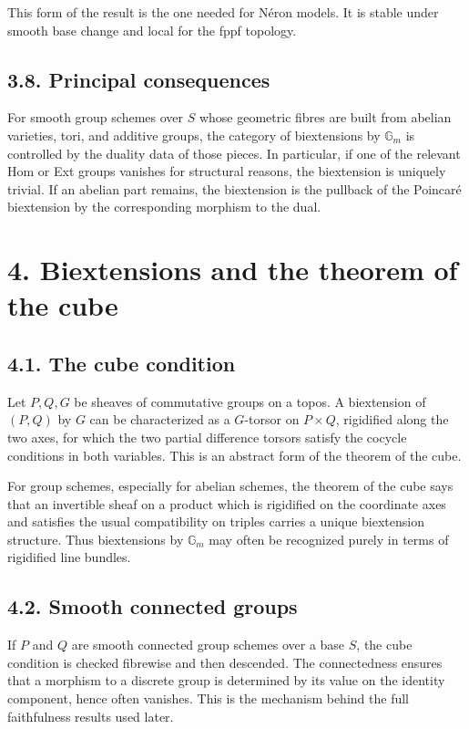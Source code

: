 \documentclass[11pt]{article}
\newcommand{\Gm}{\mathbb G_m}
\begin{document}
This form of the result is the one needed for Néron models. It is stable under
smooth base change and local for the fppf topology.

\subsection*{3.8. Principal consequences}

For smooth group schemes over \(S\) whose geometric fibres are built from
abelian varieties, tori, and additive groups, the category of biextensions by
\(\Gm\) is controlled by the duality data of those pieces. In particular, if one
of the relevant Hom or Ext groups vanishes for structural reasons, the
biextension is uniquely trivial. If an abelian part remains, the biextension is
the pullback of the Poincaré biextension by the corresponding morphism to the
dual.

\section*{4. Biextensions and the theorem of the cube}

\subsection*{4.1. The cube condition}

Let \(P,Q,G\) be sheaves of commutative groups on a topos. A biextension of
\((P,Q)\) by \(G\) can be characterized as a \(G\)-torsor on \(P\times Q\),
rigidified along the two axes, for which the two partial difference torsors
satisfy the cocycle conditions in both variables. This is an abstract form of the
theorem of the cube.

For group schemes, especially for abelian schemes, the theorem of the cube says
that an invertible sheaf on a product which is rigidified on the coordinate axes
and satisfies the usual compatibility on triples carries a unique biextension
structure. Thus biextensions by \(\Gm\) may often be recognized purely in terms
of rigidified line bundles.

\subsection*{4.2. Smooth connected groups}

If \(P\) and \(Q\) are smooth connected group schemes over a base \(S\), the cube
condition is checked fibrewise and then descended. The connectedness ensures that
a morphism to a discrete group is determined by its value on the identity
component, hence often vanishes. This is the mechanism behind the full
faithfulness results used later.
\end{document}

